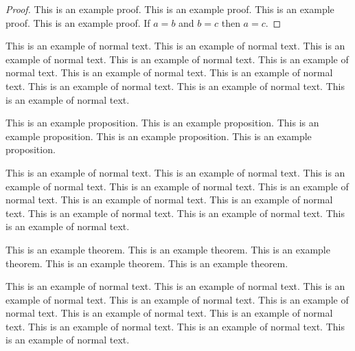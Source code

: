 \begin{refsection}
\begin{proof}
  This is an example proof.
  This is an example proof.
  This is an example proof.
  This is an example proof.
  If \(a = b\) and \(b = c\) then \(a = c\).
\end{proof}

This is an example of normal text.
This is an example of normal text.
This is an example of normal text.
This is an example of normal text.
This is an example of normal text.
This is an example of normal text.
This is an example of normal text.
This is an example of normal text.
This is an example of normal text.
This is an example of normal text.

\begin{proposition}
  This is an example proposition.
  This is an example proposition.
  This is an example proposition.
  This is an example proposition.
  This is an example proposition.
\end{proposition}

This is an example of normal text.
This is an example of normal text.
This is an example of normal text.
This is an example of normal text.
This is an example of normal text.
This is an example of normal text.
This is an example of normal text.
This is an example of normal text.
This is an example of normal text.
This is an example of normal text.

\begin{theorem}
  This is an example theorem.
  This is an example theorem.
  This is an example theorem.
  This is an example theorem.
  This is an example theorem.
\end{theorem}

This is an example of normal text.
This is an example of normal text.
This is an example of normal text.
This is an example of normal text.
This is an example of normal text.
This is an example of normal text.
This is an example of normal text.
This is an example of normal text.
This is an example of normal text.
This is an example of normal text.

\begin{singlespace}
\def\sllnsez{[1] }
\PrintChapterBibliography
\end{singlespace}

\end{refsection}

